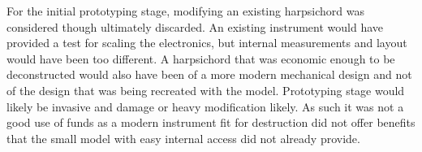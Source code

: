 
For the initial prototyping stage, modifying an existing harpsichord was
considered though ultimately discarded. An existing instrument would
have provided a test for scaling the electronics, but internal
measurements and layout would have been too different. A harpsichord that
was economic enough to be deconstructed would also have been of a more
modern mechanical design and not of the design that was being recreated
with the model. Prototyping stage would likely be invasive and damage or
heavy modification likely. As such it was not a good use of funds as a
modern instrument fit for destruction did not offer benefits that the
small model with easy internal access did not already provide.









